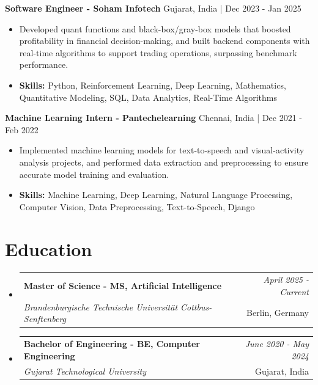 \documentclass[a4paper,11pt]{article}
\makeatletter
\newcommand{\resumeSubheading}[4]{
\vspace{0.5mm}\item
    \begin{tabular*}{\linewidth}[t]{l@{\extracolsep{\fill}}r}
        \textbf{#1} & \textit{\footnotesize{#4}} \\
        \textit{\footnotesize{#3}} &  \footnotesize{#2}\\
    \end{tabular*}
    \vspace{-2.4mm}
}
\makeatother
\begin{document}
\vspace{1mm}
  \textbf{Software Engineer - Soham Infotech} \hfill Gujarat, India | Dec 2023 - Jan 2025
\vspace{-1.5mm} %
\begin{itemize}
  \item Developed quant functions and black-box/gray-box models that boosted profitability in financial decision-making, and built backend components with real-time algorithms to support trading operations, surpassing benchmark performance.

\vspace{-2mm}
  \item \textbf{Skills:} Python, Reinforcement Learning, Deep Learning, Mathematics, Quantitative Modeling, SQL, Data Analytics, Real-Time Algorithms
\end{itemize}

\vspace{1mm}
  \textbf{Machine Learning Intern - Pantechelearning} \hfill Chennai, India | Dec 2021 - Feb 2022
\vspace{-1.5mm} %
\begin{itemize}
  \item Implemented machine learning models for text-to-speech and visual-activity analysis projects, and performed data extraction and preprocessing to ensure accurate model training and evaluation.
\vspace{-2mm}
  \item \textbf{Skills:} Machine Learning, Deep Learning, Natural Language Processing, Computer Vision, Data Preprocessing, Text-to-Speech, Django
\end{itemize}\section{\textbf{Education}}
\vspace{-0.4mm}

\begin{itemize}[leftmargin=0.15in, label={}]
\resumeSubheading
{Master of Science - MS, Artificial Intelligence }{Berlin, Germany}
{Brandenburgische Technische Universität Cottbus-Senftenberg  }{April 2025 - Current}

\vspace{1.0mm} %
\resumeSubheading
{Bachelor of Engineering - BE, Computer Engineering  }{Gujarat, India}
{Gujarat Technological University }{June 2020 - May 2024}

\end{itemize}
\end{document}
